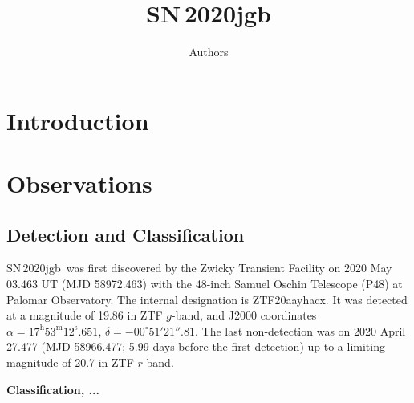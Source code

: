\documentclass[twocolumn]{aastex631}
\newcommand\sn{SN\,2020jgb}
\begin{document}
\title{\sn}

\author{Authors}

\begin{abstract}

\end{abstract}


\section{Introduction} \label{sec:intro}
\section{Observations} \label{sec:obs}
\subsection{Detection and Classification}
\sn\ was first discovered by the Zwicky Transient Facility \citep[ZTF;][]{ZTF2019a,ZTF2019b} on 2020 May 03.463 UT (MJD 58972.463) with the 48-inch Samuel Oschin Telescope (P48) at Palomar Observatory. The internal designation is ZTF20aayhacx. It was detected at a magnitude of 19.86 in ZTF $g$-band, and J2000 coordinates $\alpha=17^\mathrm{h}53^\mathrm{m}12^\mathrm{s}.651$, $\delta=-00^\circ51'21''.81$. The last non-detection was on 2020 April 27.477 (MJD 58966.477; 5.99 days before the first detection) up to a limiting magnitude of 20.7 in ZTF $r$-band.

\textbf{Classification, ...}
\end{document}
